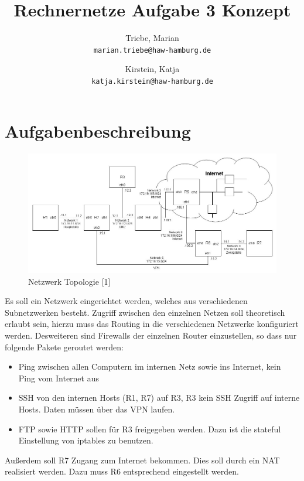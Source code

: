 \documentclass[a4paper,10pt]{article}
\title{Rechnernetze Aufgabe 3 Konzept}
\author{
  Triebe, Marian\\
  \texttt{marian.triebe@haw-hamburg.de}
  \and
  Kirstein, Katja\\
  \texttt{katja.kirstein@haw-hamburg.de}
}
\begin{document}
\maketitle

\section{Aufgabenbeschreibung}
\begin{figure}[h]
  \centering\includegraphics[scale=.35]{topo.jpg}
  \caption{Netzwerk Topologie [1]}
\end{figure}
Es soll ein Netzwerk eingerichtet werden, welches aus verschiedenen Subnetzwerken besteht. Zugriff zwischen den
einzelnen Netzen soll theoretisch erlaubt sein, hierzu muss das Routing in die verschiedenen Netzwerke konfiguriert werden.
Desweiteren sind Firewalls der einzelnen Router einzustellen, so dass nur folgende Pakete geroutet werden:
\begin{itemize}
 \item Ping zwischen allen Computern im internen Netz sowie ins Internet, kein Ping vom Internet aus
 \item SSH von den internen Hosts (R1, R7) auf R3, R3 kein SSH Zugriff auf interne Hosts. Daten müssen über das VPN laufen.
 \item FTP sowie HTTP sollen für R3 freigegeben werden. Dazu ist die stateful Einstellung von iptables zu benutzen.
\end{itemize}
Außerdem soll R7 Zugang zum Internet bekommen. Dies soll durch ein NAT realisiert werden. Dazu muss R6 entsprechend eingestellt werden.
\end{document}
